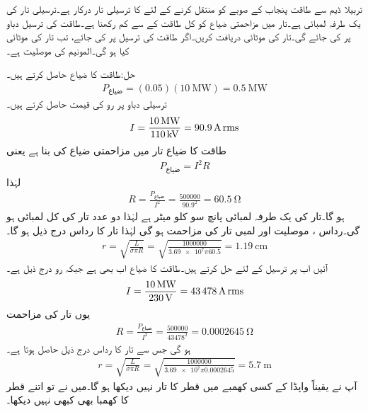 تربیلا ڈیم سے  طاقت پنجاب کے صوبے کو منتقل کرنے کے لئے  کا ترسیلی تار درکار ہے۔ترسیلی تار کی یک طرفہ لمبائی  ہے۔تار میں مزاحمتی ضیاع کو کل طاقت کے  سے کم رکھنا ہے۔طاقت کی ترسیل  دباو پر کی جائے گی۔تار کی موٹائی دریافت کریں۔اگر طاقت کی ترسیل  پر کی جائے، تب تار کی موٹائی کیا ہو گی۔المونیم کی موصلیت  ہے۔

حل:طاقت کا ضیاع حاصل کرتے ہیں۔
\begin{align*}
P_{\text{ضیاع}}=(0.05)(\SI{10}{\mega\watt})=\SI{0.5}{\mega\watt}
\end{align*}
ترسیلی دباو پر رو کی قیمت حاصل کرتے ہیں۔
\begin{align*}
I=\frac{\SI{10}{\mega\watt}}{\SI{110}{\kilo\volt}}=\SI{90.9}{\ampere}\,{\textup{rms}}
\end{align*}
طاقت کا ضیاع تار میں مزاحمتی ضیاع کی بنا ہے یعنی
\begin{align*}
P_{\text{ضیاع}}=I^2 R
\end{align*}
لہٰذا
\begin{align*}
R=\frac{P_{\text{ضیاع}}}{I^2}=\frac{\num{500000}}{90.9^2}=\SI{60.5}{\ohm}
\end{align*}
ہو گا۔تار کی یک طرفہ لمبائی پانچ سو کلو میٹر ہے لہٰذا دو عدد تار کی کل لمبائی  ہو گی۔رداس ، موصلیت  اور  لمبی تار کی مزاحمت  ہو گی لہٰذا تار کا رداس درج ذیل ہو گا۔
\begin{align*}
r=\sqrt{\frac{L}{\sigma \pi R}}=\sqrt{\frac{\num{1000000}}{\num{3.69e7} \pi 60.5}}=\SI{1.19}{\centi\meter}
\end{align*}
آئیں اب  پر ترسیل کے لئے حل کرتے ہیں۔طاقت کا ضیاع اب بھی   ہے جبکہ رو درج ذیل ہے۔
\begin{align*}
I=\frac{\SI{10}{\mega\watt}}{\SI{230}{\volt}}=\SI{43478}{\ampere}\,{\textup{rms}}
\end{align*}
یوں تار کی مزاحمت
\begin{align*}
R=\frac{P_{\text{ضیاع}}}{I^2}=\frac{\num{500000}}{43478^2}=\SI{0.0002645}{\ohm}
\end{align*}
ہو گی جس سے تار کا رداس درج ذیل حاصل ہوتا ہے۔
\begin{align*}
r=\sqrt{\frac{L}{\sigma \pi R}}=\sqrt{\frac{\num{1000000}}{\num{3.69e7} \pi 0.0002645}}=\SI{5.7}{\meter}
\end{align*}
آپ نے یقیناً واپڈا کے کسی کھمبے میں  قطر کا تار نہیں دیکھا ہو گا۔میں نے تو اتنے قطر کا کھمبا بھی کبھی نہیں دیکھا۔

